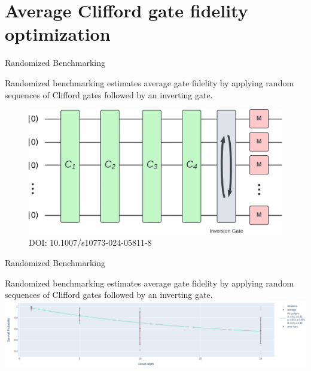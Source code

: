 \documentclass[aspectratio=169,10pt]{beamer}
\begin{document}
\section{Average Clifford gate fidelity optimization}

\begin{frame}[t,fragile]{Randomized Benchmarking}
\begin{center}
  Randomized benchmarking estimates average gate fidelity by applying random sequences of Clifford gates followed by an inverting gate.
  \vspace{3mm}
  \begin{figure}
      \includegraphics[height=0.52\textheight]{figures/RBcircuit.png}
      \caption{DOI: 10.1007/s10773-024-05811-8}
  \end{figure}
\end{center}
\end{frame}

\begin{frame}[t,fragile]{Randomized Benchmarking}
\begin{center}
  Randomized benchmarking estimates average gate fidelity by applying random sequences of Clifford gates followed by an inverting gate.
  \vfill
  \includegraphics[width=\textwidth]{figures/rb.png}
\end{center}
\end{frame}
\end{document}
